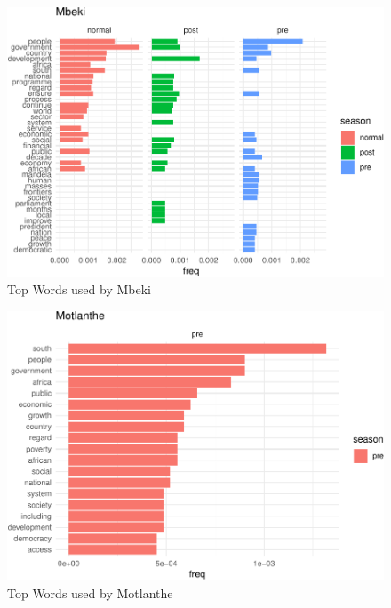\documentclass[]{article}
\begin{document}
\begin{figure}[H]

{\centering \includegraphics{datasci_fi_Assignment_2_files/figure-latex/mbeki -1} 

}

\caption{Top Words used by Mbeki}\label{fig:mbeki }
\end{figure}

\begin{figure}[H]

{\centering \includegraphics{datasci_fi_Assignment_2_files/figure-latex/Motlanthe -1} 

}

\caption{Top Words used by Motlanthe}\label{fig:Motlanthe }
\end{figure}
\end{document}
